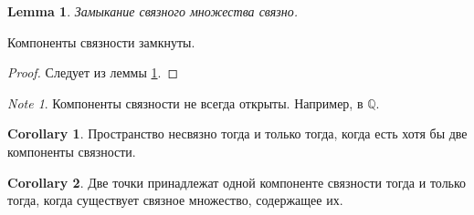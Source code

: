 \documentclass[11pt]{book}
\newcommand{\Q}{\mathbb{Q}}
\theoremstyle{definition}
\theoremstyle{plain}
\theoremstyle{plain}
\newtheorem*{lm}{Lemma}
\theoremstyle{definition}
\newtheorem*{cor}{Corollary}
\theoremstyle{remark}
\newtheorem*{note}{Note}
\begin{document}
\begin{lm}\label{lm_cl_ss}
    Замыкание связного множества связно.
\end{lm}
\begin{thm}
    Компоненты связности замкнуты.
\end{thm}
\begin{proof}
    Следует из леммы \ref{lm_cl_ss}.
\end{proof}
\begin{note}
    Компоненты связности не всегда открыты. Например,  в $ \Q$.
\end{note}
\begin{cor}
    Пространство несвязно  тогда и только тогда, когда есть хотя бы две компоненты связности.
\end{cor}
\begin{cor}
    Две точки принадлежат одной компоненте связности тогда и только тогда, когда существует связное множество, содержащее их.
\end{cor}
\end{document}

